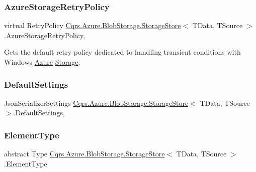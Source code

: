 \subsubsection{\texorpdfstring{Azure\+Storage\+Retry\+Policy}{AzureStorageRetryPolicy}}
{\footnotesize\ttfamily virtual Retry\+Policy \hyperlink{classCqrs_1_1Azure_1_1BlobStorage_1_1StorageStore}{Cqrs.\+Azure.\+Blob\+Storage.\+Storage\+Store}$<$ T\+Data, T\+Source $>$.Azure\+Storage\+Retry\+Policy\hspace{0.3cm}{\ttfamily [get]}, {\ttfamily [protected]}}



Gets the default retry policy dedicated to handling transient conditions with Windows \hyperlink{namespaceCqrs_1_1Azure}{Azure} \hyperlink{namespaceCqrs_1_1Azure_1_1Storage}{Storage}. 

\mbox{\label{classCqrs_1_1Azure_1_1BlobStorage_1_1StorageStore_ac5c27123fd0bf4d926a4865e2d6b0bdd_ac5c27123fd0bf4d926a4865e2d6b0bdd}} 
\subsubsection{\texorpdfstring{Default\+Settings}{DefaultSettings}}
{\footnotesize\ttfamily Json\+Serializer\+Settings \hyperlink{classCqrs_1_1Azure_1_1BlobStorage_1_1StorageStore}{Cqrs.\+Azure.\+Blob\+Storage.\+Storage\+Store}$<$ T\+Data, T\+Source $>$.Default\+Settings\hspace{0.3cm}{\ttfamily [static]}, {\ttfamily [get]}}

\mbox{\label{classCqrs_1_1Azure_1_1BlobStorage_1_1StorageStore_af298920154f31a7d0117facbb2f7cd54_af298920154f31a7d0117facbb2f7cd54}} 
\subsubsection{\texorpdfstring{Element\+Type}{ElementType}}
{\footnotesize\ttfamily abstract Type \hyperlink{classCqrs_1_1Azure_1_1BlobStorage_1_1StorageStore}{Cqrs.\+Azure.\+Blob\+Storage.\+Storage\+Store}$<$ T\+Data, T\+Source $>$.Element\+Type\hspace{0.3cm}{\ttfamily [get]}}



